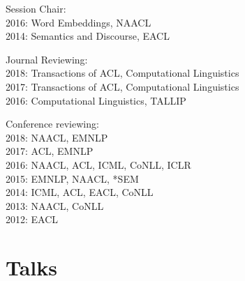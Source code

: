 \documentclass[margin,line]{res}
\begin{document}
\begin{resume}
\begin{hangparas}{.25in}{1}
Session Chair:\\
2016: Word Embeddings, NAACL\\
2014: Semantics and Discourse, EACL

Journal Reviewing: \\
2018: Transactions of ACL, Computational Linguistics\\
2017: Transactions of ACL, Computational Linguistics\\
2016: Computational Linguistics, TALLIP

Conference reviewing: \\
2018: NAACL, EMNLP\\
2017: ACL, EMNLP\\
2016: NAACL, ACL, ICML, CoNLL, ICLR\\
2015: EMNLP, NAACL, *SEM\\
2014: ICML, ACL, EACL, CoNLL \\
2013: NAACL, CoNLL \\
2012: EACL

\end{hangparas}

\section{\sc Talks}
\begin{hangparas}{.25in}{1}


\end{hangparas}
\end{resume}
\end{document}
